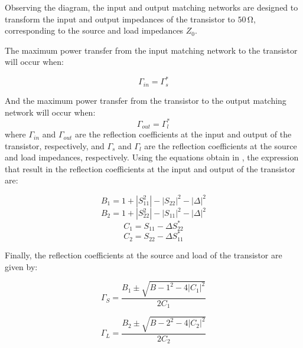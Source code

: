 Observing the diagram, the input and output matching networks are designed to transform the input and output impedances of the transistor to $50\,\si{\ohm}$, corresponding to the source and load impedances $Z_0$.

The maximum power transfer from the input matching network to the transistor will occur when:

\begin{equation}
    \Gamma_{in} = \Gamma_{s}^*
    \label{eq:GammaS=GammaL}
\end{equation}

And the maximum power transfer from the transistor to the output matching network will occur when:
\begin{equation}
    \Gamma_{out} = \Gamma_{l}^*
    \label{eq:GammaL=GammaS}
\end{equation}
where $\Gamma_{in}$ and $\Gamma_{out}$ are the reflection coefficients at the input and output of the transistor, respectively, and $\Gamma_{s}$ and $\Gamma_{l}$ are the reflection coefficients at the source and load impedances, respectively. Using the equations obtain in \cite{Pozar}, the expression that result in the reflection coefficients at the input and output of the transistor are:

\begin{equation}
    B_1 = 1 + |S_{11}^2| - |S_{22}|^2 - |\Delta|^2 
    \label{eq:B1}
\end{equation}
\begin{equation}
    B_2 = 1 + |S_{22}^2| - |S_{11}|^2 - |\Delta|^2
    \label{eq:B2}
\end{equation}
\begin{equation}
    C_1 = S_{11} - \Delta S_{22}^*
    \label{eq:C1}
\end{equation}
\begin{equation}
    C_2 = S_{22} - \Delta S_{11}^* 
    \label{eq:C2}
\end{equation}

Finally, the reflection coefficients at the source and load of the transistor are given by:

\begin{equation}
    \Gamma_{S} = \frac{B_1 \pm \sqrt{B-1^2-4|C_1|^2}}{2C_1}
    \label{eq:GammaS}
\end{equation}

\begin{equation}
    \Gamma_{L} = \frac{B_2 \pm \sqrt{B-2^2-4|C_2|^2}}{2C_2}
    \label{eq:GammaL}
\end{equation}

